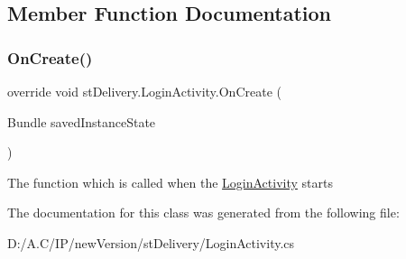 \subsection{Member Function Documentation}
\mbox{\label{classst_delivery_1_1_login_activity_aa9e751128088d9a6077d8190ba3738ff}} 
\subsubsection{\texorpdfstring{On\+Create()}{OnCreate()}}
{\footnotesize\ttfamily override void st\+Delivery.\+Login\+Activity.\+On\+Create (\begin{DoxyParamCaption}\item[{Bundle}]{saved\+Instance\+State }\end{DoxyParamCaption})\hspace{0.3cm}{\ttfamily [protected]}}



The function which is called when the \hyperlink{classst_delivery_1_1_login_activity}{Login\+Activity} starts 



The documentation for this class was generated from the following file\+:\begin{DoxyCompactItemize}
\item 
D\+:/\+A.\+C/\+I\+P/new\+Version/st\+Delivery/Login\+Activity.\+cs\end{DoxyCompactItemize}
